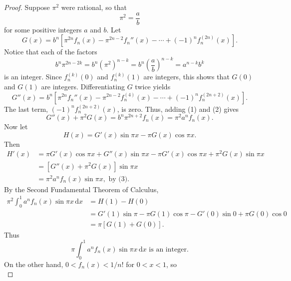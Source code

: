 \documentclass{article}
\begin{document}
\begin{proof}
  Suppose $\pi^2$ were rational, so that \begin{equation*}
    \pi^2 = \frac{a}{b}
    \end{equation*} for some positive integers $a$ and $b$. Let
  \begin{equation}
    G(x) = b^n[\pi^{2n}f_n(x) - \pi^{2n - 2}f_n''(x) - \cdots +
    (-1)^nf_n^{(2n)}(x)].
  \end{equation} Notice that each of the factors \begin{equation*}
    b^n\pi^{2n - 2k} = b^n(\pi^2)^{n - k} =
    b^n\left(\frac{a}{b}\right)^{n - k} = a^{n - k}b^k
  \end{equation*} is an integer. Since $f_n^{(k)}(0)$ and $f_n^{(k)}(1)$ are
  integers, this shows that $G(0)$ and $G(1)$ are integers. Differentiating
  $G$ twice yields \begin{equation}
    G''(x) = b^n[\pi^{2n}f_n''(x) - \pi^{2n - 2}f_n^{(4)}(x) - \cdots +
    (-1)^nf_n^{(2n + 2)}(x)].
  \end{equation} The last term, $(-1)^nf_n^{(2n + 2)}(x)$, is zero. Thus,
  adding (1) and (2) gives \begin{equation}
    G''(x) + \pi^2G(x) = b^n\pi^{2n + 2}f_n(x) = \pi^2a^nf_n(x).
  \end{equation} Now let \begin{equation*}
    H(x) = G'(x)\sin\pi x - \pi G(x) \cos\pi x.
  \end{equation*} Then \begin{align*}
    H'(x) &= \pi G'(x)\cos\pi x + G''(x)\sin\pi x - \pi G'(x) \cos\pi x + \pi^2
    G(x)\sin\pi x \\
          &= [G''(x) + \pi^2 G(x)]\sin\pi x \\
          &= \pi^2a^nf_n(x)\sin\pi x, \text{ by (3)}.
  \end{align*} By the Second Fundamental Theorem of Calculus, \begin{align*}
    \pi^2\int_0^1 a^nf_n(x)\sin\pi x \,\mathrm{d}x
    &= H(1) - H(0) \\
    &= G'(1)\sin\pi - \pi G(1)\cos\pi - G'(0)\sin 0 + \pi G(0)\cos 0 \\
    &= \pi[G(1) + G(0)].
  \end{align*} Thus \begin{equation*}
    \pi\int_0^1 a^nf_n(x)\sin\pi x \,\mathrm{d}x \text{ is an integer}.
  \end{equation*} On the other hand, $0 < f_n(x) < 1/n!$ for $0 < x < 1$, so
  \begin{equation*}

\end{equation*}
\end{proof}
\end{document}
